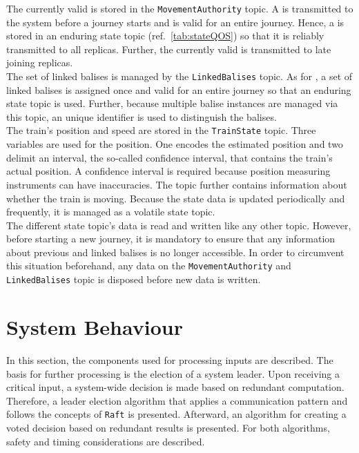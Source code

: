 The currently valid  is stored in the \texttt{MovementAuthority} topic.
A  is transmitted to the system before a journey starts and is valid for an entire journey.
Hence, a  is stored in an enduring state topic (ref.~\autoref{tab:stateQOS}) so that it is reliably transmitted to all replicas.
Further, the currently valid  is transmitted to late joining replicas.
\\

The set of linked balises is managed by the \texttt{LinkedBalises} topic.
As for , a set of linked balises is assigned once and valid for an entire journey so that an enduring state topic is used.
Further, because multiple balise instances are managed via this topic, an unique identifier is used to distinguish the balises.
\\

The train's position and speed are stored in the \texttt{TrainState} topic.
Three variables are used for the position.
One encodes the estimated position and two delimit an interval, the so-called confidence interval, that contains the train's actual position.
A confidence interval is required because position measuring instruments can have inaccuracies.
The topic further contains information about whether the train is moving.
Because the state data is updated periodically and frequently, it is managed as a volatile  state topic.
\\

The different state topic's data is read and written like any other  topic.
However, before starting a new journey, it is mandatory to ensure that any information about previous  and linked balises is no longer accessible.
In order to circumvent this situation beforehand, any data on the \texttt{MovementAuthority} and \texttt{LinkedBalises} topic is disposed before new data is written.

\section{System Behaviour}

In this section, the components used for processing inputs are described.
The basis for further processing is the election of a system leader.
Upon receiving a critical input, a system-wide decision is made based on redundant computation.
Therefore, a leader election algorithm that applies a  communication pattern and follows the concepts of \texttt{Raft} is presented.
Afterward, an algorithm for creating a voted decision based on redundant results is presented.
For both algorithms, safety and timing considerations are described.
\\

